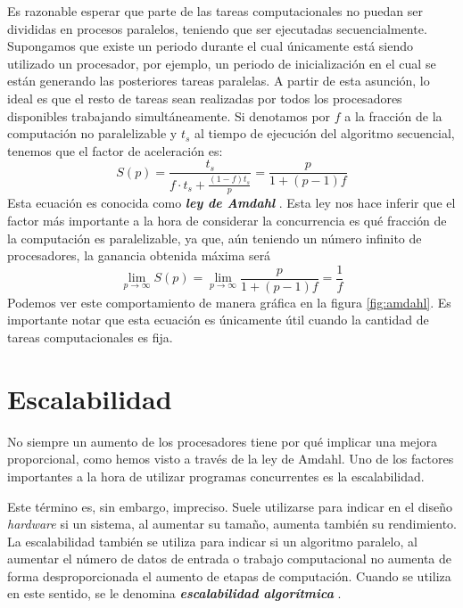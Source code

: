 \vspace{10pt}
Es razonable esperar que parte de las tareas computacionales no puedan ser divididas en procesos paralelos, teniendo
que ser ejecutadas secuencialmente. Supongamos que existe un periodo durante el cual únicamente está siendo utilizado 
un procesador, por ejemplo, un periodo de inicialización en el cual se están generando las posteriores tareas 
paralelas. A partir de esta asunción, lo ideal es que el resto de tareas sean realizadas por todos los procesadores 
disponibles trabajando simultáneamente. Si denotamos por $f$ a la fracción de la computación no paralelizable y $t_s$ 
al tiempo de ejecución del algoritmo secuencial, tenemos que el factor de aceleración es:
\begin{equation}\label{eq:ley-amdahl}
    S(p)=\frac{t_s}{f\cdot t_s+\displaystyle\frac{(1-f)t_s}{p}}=\frac{p}{1+(p-1)f}
\end{equation}
Esta ecuación es conocida como \textit{\textbf{ley de Amdahl}} \cite{wilkinson_allen_2005}. Esta ley nos hace inferir 
que el factor más importante a la hora de considerar la concurrencia es qué fracción de la computación es  
paralelizable, ya que, aún teniendo un número infinito de procesadores, la ganancia obtenida máxima será
\begin{equation}
    \lim_{p\to\infty} S(p)=\lim_{p\to\infty} \frac{p}{1+(p-1)f}=\frac{1}{f}
\end{equation}
Podemos ver este comportamiento de manera gráfica en la figura \ref{fig:amdahl}. Es importante notar que esta ecuación
es únicamente útil cuando la cantidad de tareas computacionales es fija.

\section{Escalabilidad}

No siempre un aumento de los procesadores tiene por qué implicar una mejora proporcional, como hemos visto a través de
la ley de Amdahl. Uno de los factores importantes a la hora de utilizar programas concurrentes es la escalabilidad.

\vspace{10pt}
Este término es, sin embargo, impreciso. Suele utilizarse para indicar en el diseño \textit{hardware} si un sistema,
al aumentar su tamaño, aumenta también su rendimiento. La escalabilidad también se utiliza para indicar si un algoritmo
paralelo, al aumentar el número de datos de entrada o trabajo computacional no aumenta de forma desproporcionada el
aumento de etapas de computación. Cuando se utiliza en este sentido, se le denomina 
\textbf{\textit{escalabilidad algorítmica}} \cite{wilkinson_allen_2005}. 

